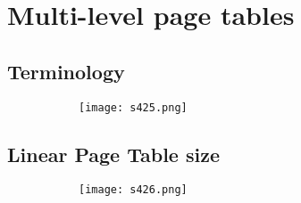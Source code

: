\documentclass[8pt]{extreport}
\begin{document}
\section{Multi-level page tables}

\subsection{Terminology}
\begin{figure}[H]
\begin{subfigure}[b]{0.4\linewidth}
\texttt{[image: s425.png]}
\end{subfigure}
\end{figure}

\subsection{Linear Page Table size}
\begin{figure}[H]
\begin{subfigure}[b]{0.4\linewidth}
\texttt{[image: s426.png]}
\end{subfigure}
\end{figure}
\end{document}
